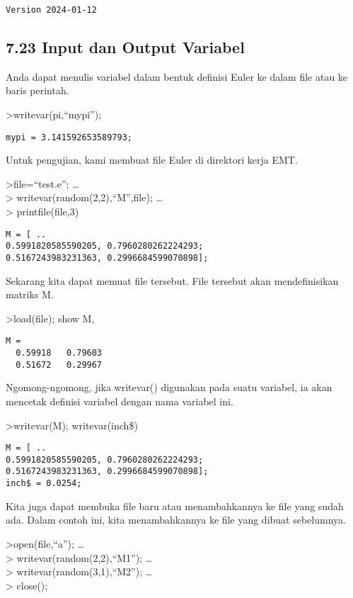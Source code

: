 \documentclass[
]{book}
\begin{document}
\begin{verbatim}
Version 2024-01-12
\end{verbatim}

\subsection{7.23 Input dan Output Variabel}\label{input-dan-output-variabel}

Anda dapat menulis variabel dalam bentuk definisi Euler ke dalam file atau ke baris perintah.

\textgreater writevar(pi,``mypi'');

\begin{verbatim}
mypi = 3.141592653589793;
\end{verbatim}

Untuk pengujian, kami membuat file Euler di direktori kerja EMT.

\textgreater file=``test.e''; \ldots{}\\
\textgreater{} writevar(random(2,2),``M'',file); \ldots{}\\
\textgreater{} printfile(file,3)

\begin{verbatim}
M = [ ..
0.5991820585590205, 0.7960280262224293;
0.5167243983231363, 0.2996684599070898];
\end{verbatim}

Sekarang kita dapat memuat file tersebut. File tersebut akan mendefinisikan matriks M.

\textgreater load(file); show M,

\begin{verbatim}
M = 
  0.59918   0.79603 
  0.51672   0.29967 
\end{verbatim}

Ngomong-ngomong, jika writevar() digunakan pada suatu variabel, ia akan mencetak definisi variabel dengan nama variabel ini.

\textgreater writevar(M); writevar(inch\$)

\begin{verbatim}
M = [ ..
0.5991820585590205, 0.7960280262224293;
0.5167243983231363, 0.2996684599070898];
inch$ = 0.0254;
\end{verbatim}

Kita juga dapat membuka file baru atau menambahkannya ke file yang sudah ada. Dalam contoh ini, kita menambahkannya ke file yang dibuat sebelumnya.

\textgreater open(file,``a''); \ldots{}\\
\textgreater{} writevar(random(2,2),``M1''); \ldots{}\\
\textgreater{} writevar(random(3,1),``M2''); \ldots{}\\
\textgreater{} close();
\end{document}

